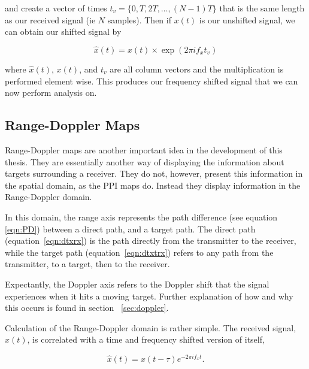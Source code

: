 \documentclass[12pt,openany,a4paper]{book}
\begin{document}
\bigskip

and create a vector of times $t_v = \{0, T, 2T, \ldots , (N-1)T\}$ that is the same length as our received signal (ie $N$ samples). Then if $x(t)$ is our unshifted signal, we can obtain our shifted signal by 

\begin{equation}
\hat{x}(t) = x(t) \times \exp (2\pi i f_x t_v )
\end{equation}

\bigskip

where $\hat{x}(t)$, $x(t)$, and $t_v$ are all column vectors and the multiplication is performed element wise. This produces our frequency shifted signal that we can now perform analysis on.


\subsection{Range-Doppler Maps}
\label{sec:rdMap}
Range-Doppler maps are another important idea in the development of this thesis. They are essentially another way of displaying the information about targets surrounding a receiver. They do not, however, present this information in the spatial domain, as the PPI maps do. Instead they display information in the Range-Doppler domain. 

\bigskip

In this domain, the range axis represents the path difference (see equation \ref{eqn:PD}) between a direct path, and a target path. The direct path (equation~\ref{eqn:dtxrx}) is the path directly from the transmitter to the receiver, while the target path (equation~\ref{eqn:dtxtrx}) refers to any path from the transmitter, to a target, then to the receiver.

\bigskip

Expectantly, the Doppler axis refers to the Doppler shift that the signal experiences when it hits a moving target. Further explanation of how and why this occurs is found in section ~\ref{sec:doppler}. 

\bigskip

Calculation of the Range-Doppler domain is rather simple. The received signal, $x(t)$, is correlated with a time and frequency shifted version of itself,

\begin{equation}
\hat{x}(t) = x(t-\tau) e^{ -2\pi i f_x t}.
\end{equation}

\bigskip
\end{document}

